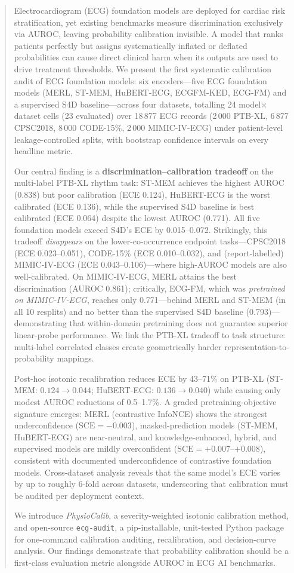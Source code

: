 \begin{abstract}
Electrocardiogram (ECG) foundation models are deployed for cardiac risk stratification, yet
existing benchmarks measure discrimination exclusively via AUROC, leaving probability
calibration invisible. A model that ranks patients perfectly but assigns systematically inflated
or deflated probabilities can cause direct clinical harm when its outputs are used to drive
treatment thresholds. We present the first systematic calibration audit of ECG foundation
models: six encoders---five ECG foundation models (MERL, ST-MEM, HuBERT-ECG, ECGFM-KED,
ECG-FM) and a supervised S4D baseline---across four datasets, totalling 24 model$\times$dataset
cells (23 evaluated) over 18\,877 ECG records (2\,000 PTB-XL, 6\,877 CPSC2018, 8\,000
CODE-15\%, 2\,000 MIMIC-IV-ECG) under patient-level leakage-controlled splits, with bootstrap
confidence intervals on every headline metric.

Our central finding is a \textbf{discrimination--calibration tradeoff} on the multi-label
PTB-XL rhythm task: ST-MEM achieves the highest AUROC (0.838) but poor calibration
(ECE 0.124), HuBERT-ECG is the worst calibrated (ECE 0.136), while the supervised S4D
baseline is best calibrated (ECE 0.064) despite the lowest AUROC (0.771). All five
foundation models exceed S4D's ECE by 0.015--0.072. Strikingly, this tradeoff
\emph{disappears} on the lower-co-occurrence endpoint tasks---CPSC2018 (ECE 0.023--0.051),
CODE-15\% (ECE 0.010--0.032), and (report-labelled) MIMIC-IV-ECG (ECE 0.043--0.106)---where
high-AUROC models are also well-calibrated. On MIMIC-IV-ECG, MERL attains the best discrimination
(AUROC 0.861); critically, ECG-FM, which was \emph{pretrained on MIMIC-IV-ECG}, reaches
only 0.771---behind MERL and ST-MEM (in all 10 resplits) and no better than the supervised
S4D baseline (0.793)---demonstrating that within-domain pretraining does not guarantee
superior linear-probe performance. We link
the PTB-XL tradeoff to task structure: multi-label correlated classes create geometrically
harder representation-to-probability mappings.

Post-hoc isotonic recalibration reduces ECE by 43--71\% on PTB-XL (ST-MEM:
$0.124\!\to\!0.044$; HuBERT-ECG: $0.136\!\to\!0.040$) while causing only modest AUROC
reductions of 0.5--1.7\%. A graded pretraining-objective signature emerges: MERL
(contrastive InfoNCE) shows the strongest underconfidence ($\text{SCE}=-0.003$),
masked-prediction models (ST-MEM, HuBERT-ECG) are near-neutral, and knowledge-enhanced,
hybrid, and supervised models are mildly overconfident ($\text{SCE}=+0.007$--$+0.008$),
consistent with documented underconfidence of contrastive foundation models. Cross-dataset
analysis reveals that the same model's ECE varies by up to roughly 6-fold across datasets,
underscoring that calibration must be audited per deployment context.

We introduce \emph{PhysioCalib}, a severity-weighted isotonic calibration method, and
open-source \texttt{ecg-audit}, a pip-installable, unit-tested Python package for
one-command calibration auditing, recalibration, and decision-curve analysis. Our findings
demonstrate that probability calibration should be a first-class evaluation metric alongside
AUROC in ECG AI benchmarks.
\end{abstract}
